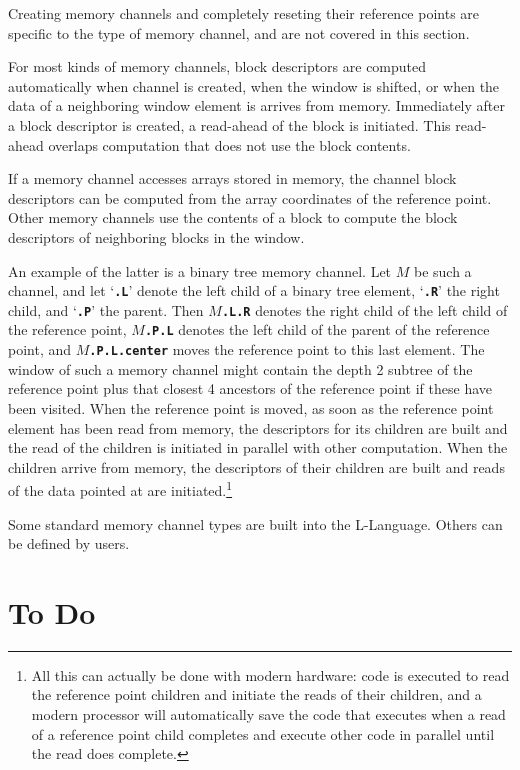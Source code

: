 \documentclass[12pt]{article}
\newcommand{\TT}[1]{{\tt \bfseries #1}}
\begin{document}
Creating memory channels and completely reseting their reference points
are specific to the type of memory channel, and are not covered in
this section.

For most kinds of memory channels, block descriptors are computed
automatically when channel is created, when the window is
shifted, or when the data of
a neighboring window element is arrives from memory.
Immediately after a block descriptor is created, a read-ahead of
the block is initiated.  This read-ahead overlaps computation that
does not use the block contents.

If a memory channel accesses arrays stored in memory,
the channel block descriptors can be computed from the array coordinates
of the reference point.  Other memory channels use the contents
of a block to compute the block descriptors of neighboring blocks
in the window.

An example of the latter is a binary tree memory channel.
Let $M$ be such a channel, and let `\TT{.L}' denote the left
child of a binary tree element, `\TT{.R}' the right child, and
`\TT{.P}' the parent.  Then $M\!$\TT{.L.R} denotes the right
child of the left child of the reference point, $M\!$\TT{.P.L}
denotes the left child of the parent of the reference point,
and $M\!$\TT{.P.L.center} moves the reference point to this last element.
The window of such a memory channel might contain the depth 2
subtree of the reference point plus that closest 4 ancestors of the
reference point if these have been visited.  When the reference
point is moved, as soon as the reference point element has been
read from memory, the descriptors for its children are built and
the read of the children is initiated in parallel with other
computation.  When the children arrive from memory, the descriptors
of their children are built and reads of the data pointed at
are initiated.\footnote{All this can actually be done with modern
hardware: code is executed to read the reference point children and initiate the
reads of their children, and a modern processor will automatically
save the code that
executes when a read of a reference point child completes and execute
other code in parallel until the read does complete.}

Some standard memory channel types are built into the L-Language.
Others can be defined by users.

\section{To Do}
\end{document}
